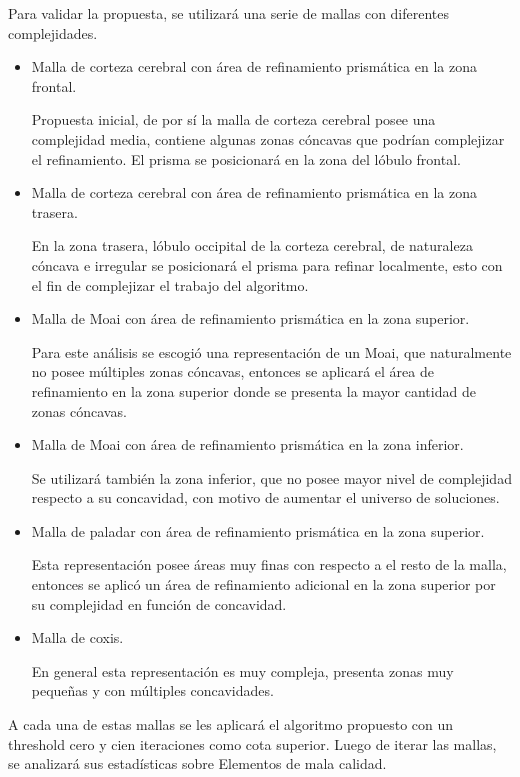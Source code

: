 Para validar la propuesta, se utilizará una serie de mallas con diferentes complejidades.
\begin{itemize}
    \item Malla de corteza cerebral con área de refinamiento prismática en la zona frontal.

        Propuesta inicial, de por sí la malla de corteza cerebral posee una complejidad media, contiene algunas zonas cóncavas que podrían complejizar el refinamiento. El prisma se posicionará en la zona del lóbulo frontal.
    \item Malla de corteza cerebral con área de refinamiento prismática en la zona trasera.

        En la zona trasera, lóbulo occipital de la corteza cerebral, de naturaleza cóncava e irregular se posicionará el prisma para refinar localmente, esto con el fin de complejizar el trabajo del algoritmo.
    \item Malla de Moai con área de refinamiento prismática en la zona superior.

        Para este análisis se escogió una representación de un Moai, que naturalmente no posee múltiples zonas cóncavas, entonces se aplicará el área de refinamiento en la zona superior donde se presenta la mayor cantidad de zonas cóncavas. 
    \item Malla de Moai con área de refinamiento prismática en la zona inferior.

        Se utilizará también la zona inferior, que no posee mayor nivel de complejidad respecto a su concavidad, con motivo de aumentar el universo de soluciones.
    \item Malla de paladar con área de refinamiento prismática en la zona superior.

        Esta representación posee áreas muy finas con respecto a el resto de la malla, entonces se aplicó un área de refinamiento adicional en la zona superior por su complejidad en función de concavidad.
    \item Malla de coxis.

        En general esta representación es muy compleja, presenta zonas muy pequeñas y con múltiples concavidades.
\end{itemize}

A cada una de estas mallas se les aplicará el algoritmo propuesto con un threshold cero y cien iteraciones como cota superior. 
Luego de iterar las mallas, se analizará sus estadísticas sobre Elementos de mala calidad.

